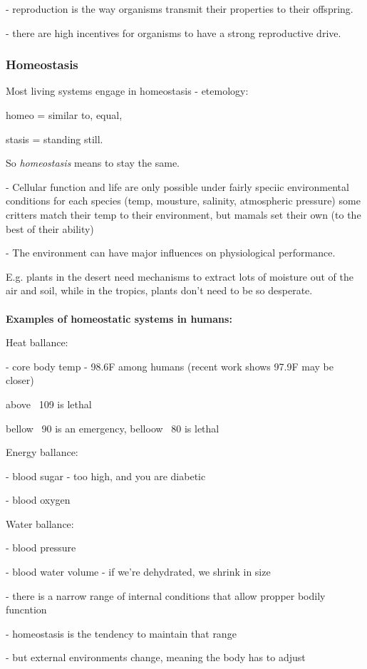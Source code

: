 \documentclass{article}
\theoremstyle{definition}
\begin{document}
- reproduction is the way organisms transmit their properties to their offspring.

- there are high incentives for organisms to have a strong reproductive drive.

\subsubsection{Homeostasis}
Most living systems engage in homeostasis - etemology: 

homeo = similar to, equal, 

stasis = standing still.

So \textit{homeostasis} means to stay the same.

- Cellular function and life are only possible under fairly speciic environmental conditions for each species (temp, mousture, salinity, atmospheric pressure)
\indent\indent * some critters match their temp to their environment, but mamals set their own (to the best of their ability)

- The environment can have major influences on physiological performance.

\indent\indent * E.g. plants in the desert need mechanisms to extract lots of moisture out of the  air and soil, while in the tropics, plants don't need to be so desperate.\\~\\

\textbf{Examples of homeostatic systems in humans:}

Heat ballance: 

- core body temp - 98.6F among humans (recent work shows 97.9F may be closer)

\indent\indent* above ~109 is lethal

\indent\indent* bellow ~90 is an emergency, belloow ~80 is lethal

Energy ballance:

- blood sugar - too high, and you are diabetic

- blood oxygen

Water ballance:

- blood pressure

- blood water volume - if we're dehydrated, we shrink in size

- there is a narrow range of internal conditions that allow propper bodily funcntion

- homeostasis is the tendency to maintain that range

- but external environments change, meaning the body has to adjust
\end{document}
